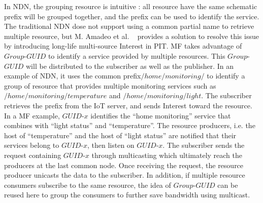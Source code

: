 In NDN, the grouping resource is intuitive : all resource have the same schematic prefix will be grouped together, and the prefix can be used to identify the service. The traditional NDN dose not support using a common partial name to retrieve multiple resource, but M. Amadeo et al. ~\cite{amadeo2014multi} provides a solution to resolve this issue by introducing long-life multi-source Interest in PIT. MF takes advantage of  $Group$-$GUID$ to identify a service provided by multiple resources. This $Group$-$GUID$ will be distributed to the subscriber as well as the publisher. In an example of NDN,  it uses the common prefix$/home/monitoring/$ to identify a group of resource that provides multiple monitoring services such as $/home/monitoring/temperature$ and $/home/monitoring/light$. The subscriber retrieves the prefix from the IoT server, and sends Interest toward the resource. In a MF example, $GUID$-$x$ identifies the ``home monitoring'' service that combines with ``light status'' and ``temperature''. The resource producers, i.e. the host of ``temperature'' and the host of ``light status'' are notified that their services belong to $GUID$-$x$, then listen on $GUID$-$x$. The subscriber sends the request containing  $GUID$-$x$ through multicasting which ultimately reach the producers at the last common node. Once receiving the request, the resource producer unicasts the data to the subscriber. In addition, if multiple resource consumers subscribe to the same resource, the idea of $Group$-$GUID$ can be reused here to group the consumers to further save bandwidth using multicast.

